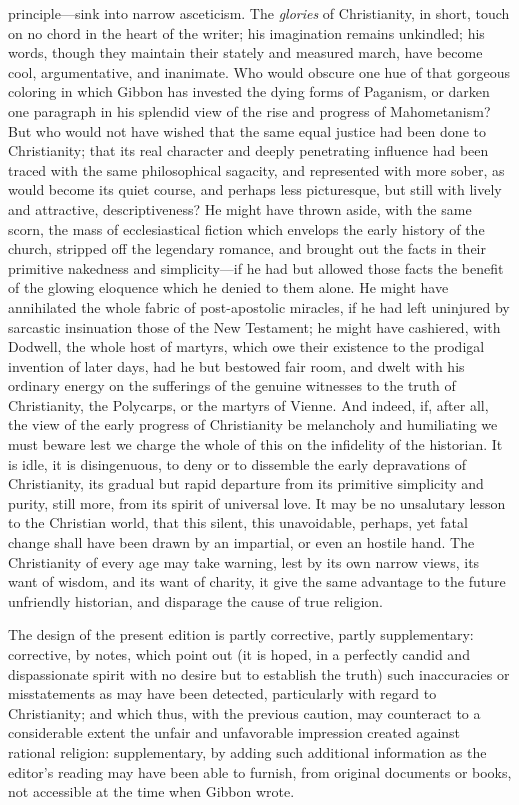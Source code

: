 principle—sink into narrow asceticism. The \textit{glories} of Christianity, in short, touch on no chord in the heart of the writer; his imagination remains unkindled; his words, though they maintain their stately and measured march, have become cool, argumentative, and inanimate. Who would obscure one hue of that gorgeous coloring in which Gibbon has invested the dying forms of Paganism, or darken one paragraph in his splendid view of the rise and progress of Mahometanism? But who would not have wished that the same equal justice had been done to Christianity; that its real character and deeply penetrating influence had been traced with the same philosophical sagacity, and represented with more sober, as would become its quiet course, and perhaps less picturesque, but still with lively and attractive, descriptiveness? He might have thrown aside, with the same scorn, the mass of ecclesiastical fiction which envelops the early history of the church, stripped off the legendary romance, and brought out the facts in their primitive nakedness and simplicity—if he had but allowed those facts the benefit of the glowing eloquence which he denied to them alone. He might have annihilated the whole fabric of post-apostolic miracles, if he had left uninjured by sarcastic insinuation those of the New Testament; he might have cashiered, with Dodwell, the whole host of martyrs, which owe their existence to the prodigal invention of later days, had he but bestowed fair room, and dwelt with his ordinary energy on the sufferings of the genuine witnesses to the truth of Christianity, the Polycarps, or the martyrs of Vienne. And indeed, if, after all, the view of the early progress of Christianity be melancholy and humiliating we must beware lest we charge the whole of this on the infidelity of the historian. It is idle, it is disingenuous, to deny or to dissemble the early depravations of Christianity, its gradual but rapid departure from its primitive simplicity and purity, still more, from its spirit of universal love. It may be no unsalutary lesson to the Christian world, that this silent, this unavoidable, perhaps, yet fatal change shall have been drawn by an impartial, or even an hostile hand. The Christianity of every age may take warning, lest by its own narrow views, its want of wisdom, and its want of charity, it give the same advantage to the future unfriendly historian, and disparage the cause of true religion.

The design of the present edition is partly corrective, partly supplementary: corrective, by notes, which point out (it is hoped, in a perfectly candid and dispassionate spirit with no desire but to establish the truth) such inaccuracies or misstatements as may have been detected, particularly with regard to Christianity; and which thus, with the previous caution, may counteract to a considerable extent the unfair and unfavorable impression created against rational religion: supplementary, by adding such additional information as the editor’s reading may have been able to furnish, from original documents or books, not accessible at the time when Gibbon wrote.

